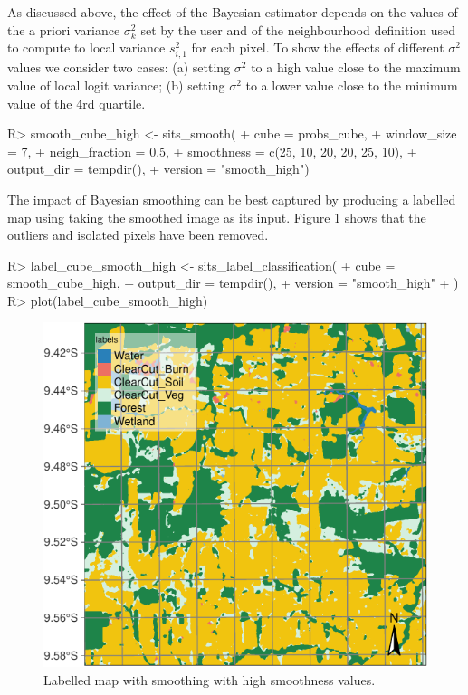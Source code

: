 \documentclass[
]{jss}
\begin{document}
As discussed above, the effect of the Bayesian estimator depends on the values of the a priori variance \(\sigma^2_{k}\) set by the user and of the neighbourhood definition used to compute to local variance \(s^2_{i,1}\) for each pixel. To show the effects of different \(\sigma^2\) values we consider two cases: (a) setting \(\sigma^2\) to a high value close to the maximum value of local logit variance; (b) setting \(\sigma^2\) to a lower value close to the minimum value of the 4rd quartile.

\begin{CodeChunk}
\begin{CodeInput}
R> smooth_cube_high <- sits_smooth(
+     cube = probs_cube,
+     window_size = 7,
+     neigh_fraction = 0.5,
+     smoothness = c(25, 10, 20, 20, 25, 10),
+     output_dir = tempdir(),
+     version = "smooth_high")
\end{CodeInput}
\end{CodeChunk}

The impact of Bayesian smoothing can be best captured by producing a labelled map using  taking the smoothed image as its input. Figure \ref{fig:smth1} shows that the outliers and isolated pixels have been removed.

\begin{CodeChunk}
\begin{CodeInput}
R> label_cube_smooth_high <- sits_label_classification(
+   cube = smooth_cube_high,
+   output_dir = tempdir(),
+   version = "smooth_high"
+ )
R> plot(label_cube_smooth_high)
\end{CodeInput}
\begin{figure}[h]

{\centering \includegraphics{Bayesian_smoothing_JSS_files/figure-latex/smth1-1} 

}

\caption[Labelled map with smoothing with high smoothness values]{Labelled map with smoothing with high smoothness values.}\label{fig:smth1}
\end{figure}
\end{CodeChunk}
\end{document}
